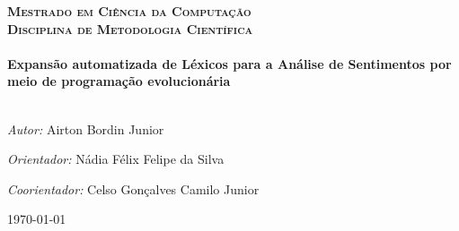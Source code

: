 \documentclass[a4paper,11pt]{article}
\begin{document}
\begin{titlepage}
\begin{center}
\begin{figure}
\begin{minipage}{.5\textwidth}
\end{minipage}
\end{figure}



\textsc{\large \textbf{Mestrado em Ciência da Computação}}\\[0.5cm]
\textsc{\large \textbf{Disciplina de Metodologia Científica}}\\[1.5cm] %


\HRule \\[0.4cm]
{ \huge \bfseries Expansão automatizada de Léxicos para a Análise de Sentimentos por meio de programação evolucionária}\\[0.4cm] %
\HRule \\[1.5cm]


\begin{framed}
\emph{Autor:} Airton Bordin Junior
\par
\emph{Orientador:} Nádia Félix Felipe da Silva
\par
\emph{Coorientador:} Celso Gonçalves Camilo Junior
\end{framed}

\vspace*{3cm}


{\large \today}\\ %

\end{center}


\vfill %

\end{titlepage}
\end{document}
